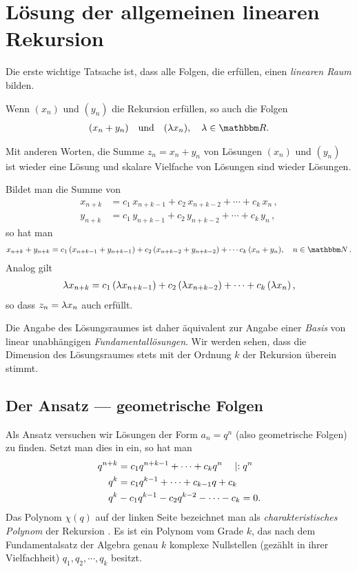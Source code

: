\documentclass[11pt,a4paper]{article}
\begin{document}
\section{Lösung der allgemeinen linearen Rekursion \rf[e-linrek]}
Die erste wichtige Tatsache ist, dass alle Folgen, die \rf[e-linrek] erfüllen, 
einen \emph{linearen Raum} bilden.

\begin{satz} \label{s-1}
Wenn $(x_n)$ und $(y_n)$ die Rekursion \rf[e-linrek] erfüllen, so auch die
Folgen
\begin{gather*}
  (x_n + y_n) \quad\text{und}\quad (\lam x_n),\quad \lam\in\R.
\end{gather*}
\end{satz}

Mit anderen Worten, die Summe $z_n=x_n +y_n$ von Lösungen $(x_n) $ und $(y_n)$
ist wieder eine Lösung und skalare Vielfache von Lösungen sind wieder Lösungen.

\begin{beweis} Bildet man die Summe von
\begin{align*}
x_{n+k}& =c_1\, x_{n+k-1} +c_2\,x_{n+k-2} +\cdots + c_k\,x_n\,,\\
y_{n+k}&=c_1\, y_{n+k-1} +c_2\, y_{n+k-2} +\cdots + c_k\, y_n\,,
\end{align*}
so hat man
\begin{gather*}
  x_{n+k} +y_{n+k} = c_1\,(x_{n+k-1} +y_{n+k-1}) +c_2\, (x_{n+k-2} +y_{n+k-2})
  +\cdots c_k\,( x_n +y_n), \quad n\in \N\,.
\end{gather*}
Analog gilt
\begin{gather*}
  \lambda x_{n+k} =c_1\,(\lambda x_{n+k-1}) +c_2\,(\lambda x_{n+k-2}) +\cdots + c_k
  \,(\lambda x_n)\,,
\end{gather*}
so dass $z_n=\lambda x_n$ auch \rf[e-linrek] erfüllt.  

Die Angabe des Lösungsraumes ist daher äquivalent zur Angabe einer \emph{Basis}
von linear unabhängigen \emph{Fundamentallösungen}. Wir werden sehen, dass die
Dimension des Lösungsraumes stets mit der Ordnung $k$ der Rekursion überein
stimmt.
\end{beweis}

\subsection{Der Ansatz --- geometrische Folgen} Als Ansatz versuchen wir 
Lösungen der Form $a_n=q^{n}$ (also geometrische Folgen) zu finden.
Setzt man dies in \rf[e-linrek] ein, so hat man
\begin{align}
q^{n+k} &=c_1 q^{n+k-1} +\cdots + c_k q^n\quad \mid :q^n\label{e-char1} \\
q^k&= c_1q^{k-1} +\cdots +c_{k-1} q + c_k\nonumber\\
q^k&-c_1q^{k-1} -c_2 q^{k-2}- \cdots -c_k=0\label{e-char}.
\end{align}
Das Polynom $\chi(q) $ auf der linken Seite bezeichnet man als
\emph{charakteristisches Polynom} der Rekursion \rf[e-linrek]. Es ist ein
Polynom vom Grade $k$, das nach dem Fundamentalsatz der Algebra genau $k$
komplexe Nullstellen (gezählt in ihrer Vielfachheit) $q_1,q_2,\cdots ,q_k$
besitzt.
\end{document}
